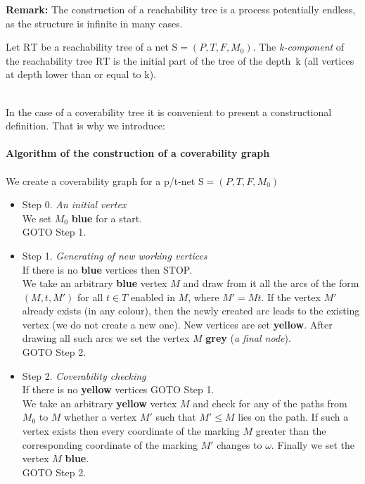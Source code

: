 \documentclass[a4paper]{llncs}
\begin{document}
\textbf{Remark:} The construction of a reachability tree is a process potentially endless, as the structure is infinite in many cases.\\
\begin{definition}
Let $\mathrm{RT}$ be a reachability tree of a net $\mathrm{S}=(P,T,F,M_0)$. The \emph{k-component} of the reachability tree $\mathrm{RT}$ is the initial part of the tree of the depth~k (all vertices at depth lower than or equal to k).
\end{definition}\mbox{ }\\
In the case of a coverability tree it is convenient to present a constructional definition. That is why we introduce:
\\ \\
\textbf{Algorithm of the construction of a coverability graph}
\\ \\
We create a coverability graph for a p/t-net $\mathrm{S}=(P,T,F,M_0)$
\begin{itemize}
\item Step 0. \textit{An initial vertex}\\
We set $M_0$ \textbf{blue} for a start.\\
GOTO Step 1.\\ 
\item Step 1. \textit{Generating of new working vertices}\\
If there is no \textbf{blue} vertices then STOP.\\
We take an arbitrary \textbf{blue} vertex $M$ and draw from it all the arcs of the form $(M,t,M')$ for all $t\in T$ enabled in $M$, where $M'=Mt$. If the vertex $M'$ already exists (in any colour), then the newly created arc leads to the existing vertex (we do not create a new one). New vertices are set \textbf{yellow}. After drawing all such arcs we set the vertex $M$  \textbf{grey} (\textit{a final node}).\\
GOTO Step 2.\\ 
\item Step 2. \textit{Coverability checking}\\
If there is no \textbf{yellow} vertices GOTO Step 1.\\
We take an arbitrary \textbf{yellow} vertex $M$ and check for any of the paths from $M_0$ to $M$ whether a vertex $M'$ such that $M'\leq M$ lies on the path. If such a vertex exists then every coordinate of the marking $M$ greater than the corresponding coordinate of the marking $M'$ changes to $\omega$. Finally we set the vertex $M$ \textbf{blue}.\\
GOTO Step 2.\\ 
\end{itemize}
\end{document}
